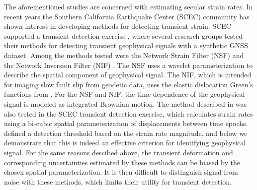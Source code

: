\documentclass[extra,mreferee]{gji}
\begin{document}
The aforementioned studies are concerned with estimating secular strain rates. In recent years the Southern California Earthquake Center (SCEC) community has shown interest in developing methods for detecting transient strain. SCEC supported a transient detection exercise \citep{Lohman2013}, where several research groups tested their methods for detecting transient geophysical signals with a synthetic GNSS dataset. Among the methods tested were the Network Strain Filter (NSF) \citep{Ohtani2010} and the Network Inversion Filter (NIF) \citep{Segall1997}. The NSF uses a wavelet parameterization to  describe the spatial component of geophysical signal. The NIF, which is intended for imaging slow fault slip from geodetic data, uses the elastic dislocation Green's functions from \citet{Okada1992}. For the NSF and NIF, the time dependence of the geophysical signal is modeled as integrated Brownian motion. The method described in \citet{Holt2013} was also tested in the SCEC transient detection exercise, which calculates strain rates using a bi-cubic spatial parameterization of displacements between time epochs. \citet{Holt2013} defined a detection threshold based on the strain rate magnitude, and below we demonstrate that this is indeed an effective criterion for identifying geophysical signal. For the same reasons descibed above, the transient deformation and corresponding uncertainties estimated by these methods can be biased by the chosen spatial parameterization. It is then difficult to distinguish signal from noise with these methods, which limits their utility for transient detection.   
\end{document}
